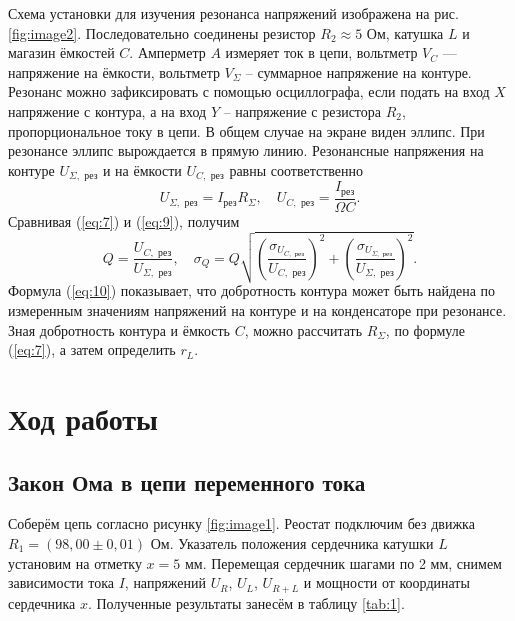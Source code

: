 \documentclass[a4paper,12pt]{article} %
\begin{document}
Схема установки для изучения резонанса напряжений изображена на рис. \ref{fig:image2}. Последовательно соединены резистор $ R_2 \approx 5 $ Ом, катушка $ L $ и магазин ёмкостей $ C $. Амперметр $ A $ измеряет ток в цепи, вольтметр $ V_C $ — напряжение на ёмкости, вольтметр $ V_{\Sigma} $ -- суммарное напряжение на контуре. Резонанс можно зафиксировать с помощью осциллографа, если подать на вход $ X $ напряжение с контура, а на вход $ Y $ -- напряжение с резистора $ R_2 $, пропорциональное току в цепи. В общем случае на экране виден эллипс. При резонансе эллипс вырождается в прямую линию.
Резонансные напряжения на контуре $ U_{\Sigma,\text{ рез}} $ и на ёмкости $ U_{C,\text{ рез}} $ равны соответственно
\begin{equation}\label{eq:9}
U_{\Sigma,\text{ рез}} = I_{\text{рез}}R_{\Sigma}, \quad U_{C,\text{ рез}} = \dfrac{I_{\text{рез}}}{\Omega C}.
\end{equation}
Сравнивая (\ref{eq:7}) и (\ref{eq:9}), получим
\begin{equation}\label{eq:10}
Q = \dfrac{U_{C,\text{ рез}}}{U_{\Sigma,\text{ рез}}}, \quad {\sigma _Q} = Q\sqrt {{{\left( {\frac{{{\sigma_{U_{C,\text{ рез}}}}}}{U_{C,\text{ рез}}}} \right)}^2} + {{\left( {\frac{{{\sigma_{U_{\Sigma,\text{ рез}}}}}}{U_{\Sigma,\text{ рез}}}} \right)}^2}} .
\end{equation}
Формула (\ref{eq:10}) показывает, что добротность контура может быть найдена по измеренным значениям напряжений на контуре и на конденсаторе при резонансе. Зная добротность контура и ёмкость $ C $, можно рассчитать $ R_{\Sigma} $, по формуле (\ref{eq:7}), а затем определить $ r_L $.

\section{Ход работы}
\subsection{Закон Ома в цепи переменного тока}

Соберём цепь согласно рисунку \ref{fig:image1}. Реостат подключим без движка $ R_1 = (98,00 \pm 0,01) $ Ом. Указатель положения сердечника катушки $ L $ установим на отметку $ x = 5 $ мм. Перемещая сердечник шагами по 2 мм, снимем зависимости тока $ I $, напряжений $ U_R $, $ U_L $, $ U_{R+L} $ и мощности от координаты сердечника $ x $. Полученные результаты занесём в таблицу \ref{tab:1}.
\end{document}

